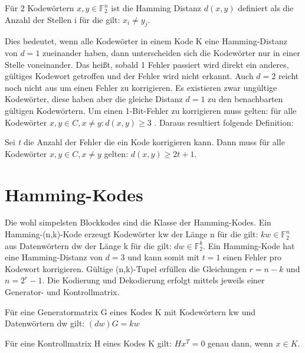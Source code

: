 \begin{t_def}
Für 2 Kodewörtern $x,y \in \mathbb{F}_{2}^{n}$ ist die Hamming Distanz $d(x,y)$ definiert als die Anzahl der Stellen i für die gilt: $x_i \neq y_j$.
\end{t_def}

Dies bedeutet, wenn alle Kodewörter in einem Kode K eine Hamming-Distanz von $d=1$ zueinander haben, dann unterscheiden sich die Kodewörter nur in einer Stelle voneinander. Das heißt, sobald 1 Fehler passiert wird direkt ein anderes, gültiges Kodewort getroffen und der Fehler wird nicht erkannt. Auch $d=2$ reicht noch nicht aus um einen Fehler zu korrigieren. Es existieren zwar ungültige Kodewörter, diese haben aber die gleiche Distanz $d=1$ zu den benachbarten gültigen Kodewörtern. Um einen 1-Bit-Fehler zu korrigieren muss gelten: für alle Kodewörter $x,y \in C,x \neq y \colon d(x,y) \geq 3$ .\cite[S. 7ff]{huffman2010fundamentals} Daraus resultiert folgende Definition:

\begin{t_def}
\label{def:t}
Sei {\em t} die Anzahl der Fehler die ein Kode korrigieren kann. Dann muss für alle Kodewörter $x,y \in C,x \neq y$ gelten: $d(x,y) \geq 2t + 1$.
\end{t_def}


\section{Hamming-Kodes}
\label{section:hamming}

Die wohl simpelsten Blockkodes sind die Klasse der Hamming-Kodes. Ein Hamming-(n,k)-Kode erzeugt Kodewörter kw der Länge n für die gilt: $kw \in \mathbb{F}_{2}^{n}$ aus Datenwörtern dw der Länge k für die gilt: $dw \in \mathbb{F}_{2}^{k}$. Ein Hamming-Kode hat eine Hamming-Distanz von $d=3$ und kann somit mit $t=1$ einen Fehler pro Kodewort korrigieren. Gültige (n,k)-Tupel erfüllen die Gleichungen $r = n - k$ und $n = 2^r - 1$.\cite[S. 29]{huffman2010fundamentals} Die Kodierung und Dekodierung erfolgt mittels jeweils einer Generator- und Kontrollmatrix.

\begin{t_def}
\label{def:genmatrix}
Für eine Generatormatrix G eines Kodes K mit Kodewörtern kw und Datenwörtern dw gilt: $ (dw)G = kw$
\end{t_def}

\begin{t_def}
\label{def:checkmatrix}
Für eine Kontrollmatrix H eines Kodes K gilt: $ Hx^T = 0$ genau dann, wenn $x \in K$.
\end{t_def}

